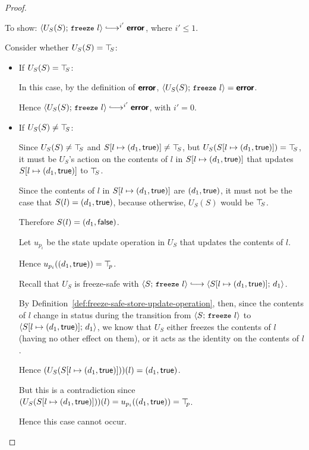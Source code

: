 \begin{proof}
\begin{itemize}
    To show: $\config{U_S(S)}{\freeze{l}} \parstepsto^{i'} \error$,
    where $i' \leq 1$.

    Consider whether $U_S(S) = \top\hspace{-0.85mm}_{S}$:
    \begin{itemize}

    \item If $U_S(S) = \top\hspace{-0.85mm}_{S}$:

      In this case, by the definition of $\textbf{\textsf{error}}$,
      $\langle U_S(S);\, \mbox{\small{\texttt{freeze}}}~l \rangle = \textbf{\textsf{error}}$.

      Hence $\config{U_S(S)}{\freeze{l}}
      \parstepsto^{i'} \error$, with $i' = 0$.

    \item If $U_S(S) \neq \top\hspace{-0.85mm}_{S}$:

      Since $U_S(S) \neq \top\hspace{-0.85mm}_{S}$ and $S[l \mapsto (d_1, \textsf{true})]
      \neq \top\hspace{-0.85mm}_{S}$, but $U_S(S[l \mapsto (d_1, \textsf{true})]) = \top\hspace{-0.85mm}_{S}$,
      it must be $U_S$'s action on the contents of $l$ in
      $S[l \mapsto (d_1, \textsf{true})]$ that updates
      $S[l \mapsto (d_1, \textsf{true})]$ to $\top\hspace{-0.85mm}_{S}$.

      Since the contents of $l$ in $S[l \mapsto (d_1, \textsf{true})]$ are
      $(d_1, \textsf{true})$, it must not be the case that $S(l) =
      (d_1, \textsf{true})$, because otherwise, $U_S(S)$ would be
      $\top\hspace{-0.85mm}_{S}$.

      Therefore $S(l) = (d_1, \textsf{false})$.

      Let $u_{p_i}$ be the state update operation in $U_S$ that
      updates the contents of $l$.

      Hence $u_{p_i}((d_1, \textsf{true})) = \top\hspace{-0.85mm}_{p}$.

      Recall that $U_S$ is freeze-safe with $\config{S}{\freeze{l}}
      \parstepsto \config{\extS{S}{l}{d_1}{\frozentrue}}{d_1}$.

      By Definition~\ref{def:freeze-safe-store-update-operation},
      then, since the contents of $l$ change in status during the
      transition from $\langle S;\, \mbox{\small{\texttt{freeze}}}~l \rangle$ to
      $\langle S[l \mapsto (d_1, \textsf{true})];\, d_1 \rangle$, we know that
      $U_S$ either freezes the contents of $l$ (having no other effect
      on them), or it acts as the identity on the contents of $l$.

      Hence $(U_S(S[l \mapsto (d_1, \textsf{true})]))(l) =
      (d_1, \textsf{true})$.

      But this is a contradiction since
      $(U_S(S[l \mapsto (d_1, \textsf{true})]))(l) =
      u_{p_i}((d_1, \textsf{true})) = \top\hspace{-0.85mm}_{p}$.

      Hence this case cannot occur.
    \end{itemize}

  \end{itemize}
\end{proof}

